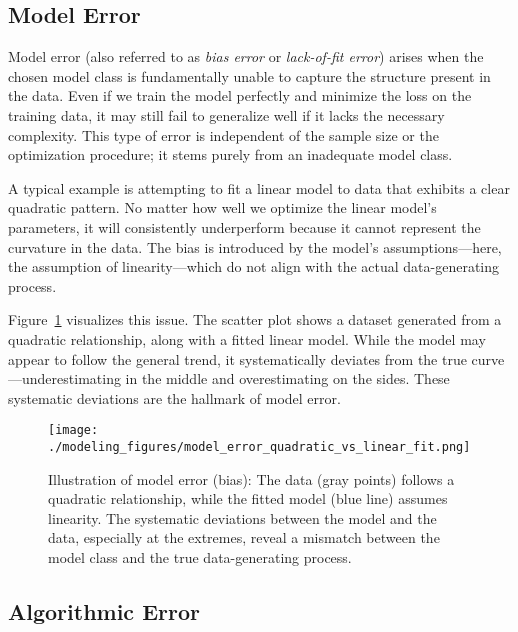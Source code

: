 \documentclass[12pt,openany, draft]{book}
\begin{document}
\subsection{Model Error}  \label{subsec:model_error}

Model error (also referred to as \textit{bias error} or \textit{lack-of-fit error}) arises when the chosen model class is fundamentally unable to capture the structure present in the data. Even if we train the model perfectly and minimize the loss on the training data, it may still fail to generalize well if it lacks the necessary complexity. This type of error is independent of the sample size or the optimization procedure; it stems purely from an inadequate model class. \newline

A typical example is attempting to fit a linear model to data that exhibits a clear quadratic pattern. No matter how well we optimize the linear model's parameters, it will consistently underperform because it cannot represent the curvature in the data. The bias is introduced by the model’s assumptions—here, the assumption of linearity—which do not align with the actual data-generating process. \newline

Figure~\ref{fig:model-error-linear-fit} visualizes this issue. The scatter plot shows a dataset generated from a quadratic relationship, along with a fitted linear model. While the model may appear to follow the general trend, it systematically deviates from the true curve—underestimating in the middle and overestimating on the sides. These systematic deviations are the hallmark of model error.

\begin{figure}[H]
    \centering
    \texttt{[image: ./modeling\_figures/model\_error\_quadratic\_vs\_linear\_fit.png]}
    \caption{
    Illustration of model error (bias): The data (gray points) follows a quadratic relationship, while the fitted model (blue line) assumes linearity. The systematic deviations between the model and the data, especially at the extremes, reveal a mismatch between the model class and the true data-generating process. 
    }
    \label{fig:model-error-linear-fit}
\end{figure}


\subsection{Algorithmic Error}  \label{subsec:algorithmic_error}
\end{document}
